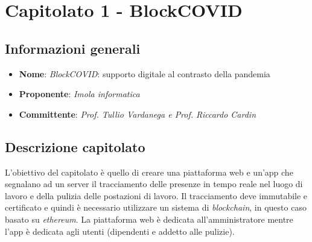 \section{Capitolato 1 - BlockCOVID}
\subsection{Informazioni generali}
\begin{itemize}
    \item \textbf{Nome}: \emph{BlockCOVID}: supporto digitale al contrasto della pandemia
    \item \textbf{Proponente}: \emph{Imola informatica}
    \item \textbf{Committente}: \emph{Prof. Tullio Vardanega e Prof. Riccardo Cardin}
\end{itemize}
\subsection{Descrizione capitolato}
L'obiettivo del capitolato è quello di creare una piattaforma web e un'app che segnalano ad un server il tracciamento delle presenze in tempo reale nel luogo di lavoro e della pulizia delle postazioni di lavoro. Il tracciamento deve immutabile e certificato e quindi è necessario utilizzare un sistema di \emph{blockchain}, in questo caso basato su \emph{ethereum}. La piattaforma web è dedicata all'amministratore mentre l'app è dedicata agli utenti (dipendenti e addetto alle pulizie).
